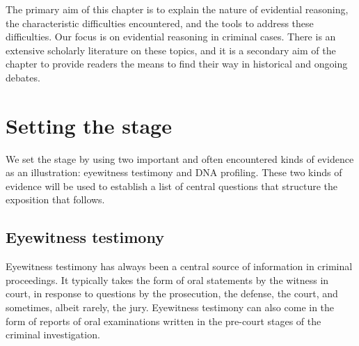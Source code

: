 \documentclass[10pt]{article}
\begin{document}
The primary aim of this chapter is to explain the nature of evidential reasoning, the characteristic difficulties encountered, and the tools to address these difficulties. 
Our focus is on evidential reasoning in criminal cases. There is an extensive scholarly literature on these topics, 
and it is a secondary aim of the chapter to provide readers the means to find their way in historical and ongoing debates. 



\section{Setting the stage}

We set the stage by using two important and often encountered kinds of evidence as an illustration: eyewitness testimony and DNA profiling. 
These two kinds of evidence will be used to establish a list of central questions that structure the exposition that follows.

\subsection{Eyewitness testimony}

Eyewitness testimony has always been a central source of information in criminal proceedings. It typically takes the form of 
oral statements by the witness in court, in response to questions by the prosecution, the defense, the court, and sometimes, albeit rarely, the jury. 
Eyewitness testimony can also come in the form of reports of oral 
examinations written in the pre-court stages of the criminal investigation. %
\end{document}
